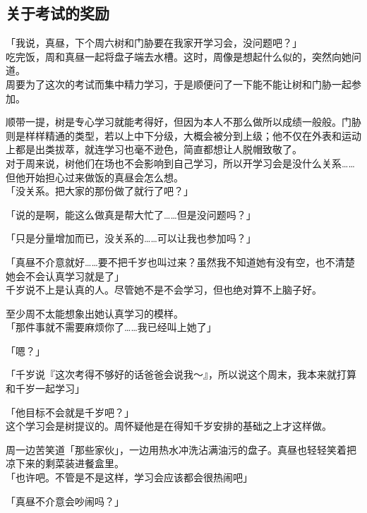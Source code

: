 ﻿\subsection{关于考试的奖励}

「我说，真昼，下个周六树和门胁要在我家开学习会，没问题吧？」\\

吃完饭，周和真昼一起将盘子端去水槽。这时，周像是想起什么似的，突然向她问道。\\

周要为了这次的考试而集中精力学习，于是顺便问了一下能不能让树和门胁一起参加。

顺带一提，树是专心学习就能考得好，但因为本人不那么做所以成绩一般般。门胁则是样样精通的类型，若以上中下分级，大概会被分到上级；他不仅在外表和运动上都是出类拔萃，就连学习也毫不逊色，简直都想让人脱帽致敬了。\\

对于周来说，树他们在场也不会影响到自己学习，所以开学习会是没什么关系……但他开始担心过来做饭的真昼会怎么想。\\

「没关系。把大家的那份做了就行了吧？」

「说的是啊，能这么做真是帮大忙了……但是没问题吗？」

「只是分量增加而已，没关系的……可以让我也参加吗？」

「真昼不介意就好……要不把千岁也叫过来？虽然我不知道她有没有空，也不清楚她会不会认真学习就是了」\\

千岁说不上是认真的人。尽管她不是不会学习，但也绝对算不上脑子好。

至少周不太能想象出她认真学习的模样。\\

「那件事就不需要麻烦你了……我已经叫上她了」

「嗯？」

「千岁说『这次考得不够好的话爸爸会说我～』，所以说这个周末，我本来就打算和千岁一起学习」

「他目标不会就是千岁吧？」\\

这个学习会是树提议的。周怀疑他是在得知千岁安排的基础之上才这样做。

周一边苦笑道「那些家伙」，一边用热水冲洗沾满油污的盘子。真昼也轻轻笑着把凉下来的剩菜装进餐盒里。\\

「也许吧。不管是不是这样，学习会应该都会很热闹吧」

「真昼不介意会吵闹吗？」

